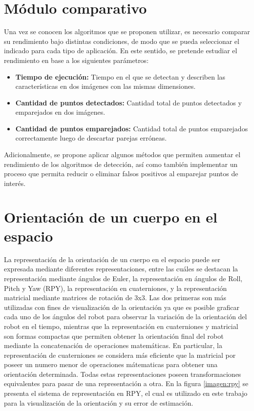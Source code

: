 \section{Módulo comparativo}

Una vez se conocen los algoritmos que se proponen utilizar, es necesario comparar su rendimiento bajo distintas condiciones, de modo que se pueda seleccionar el indicado para cada tipo de aplicación. En este sentido, se pretende estudiar el rendimiento en base a los siguientes parámetros:

\begin{itemize}
	\item \textbf{Tiempo de ejecución:} Tiempo en el que se detectan y describen las características en dos imágenes con las mismas dimensiones.
	
	\item \textbf{Cantidad de puntos detectados:} Cantidad total de puntos detectados y emparejados en dos imágenes.
	
	\item \textbf{Cantidad de puntos emparejados:} Cantidad total de puntos emparejados correctamente luego de descartar parejas erróneas. 
\end{itemize}

Adicionalmente, se propone aplicar algunos métodos que permiten aumentar el rendimiento de los algoritmos de detección, así como también implementar un proceso que permita reducir o eliminar falsos positivos al emparejar puntos de interés. 

\section{ Orientación de un cuerpo en el espacio}

La representación de la orientación de un cuerpo en el espacio puede ser expresada mediante diferentes representaciones, entre las cuáles se destacan la representación mediante ángulos de Euler,  la representación en ángulos de Roll, Pitch y Yaw (RPY), la representación en cuaterniones, y la representación  matricial mediante matrices de rotación de 3x3. Las dos primeras son más utilizadas con fines de visualización de la orientación ya que es posible graficar cada uno de los ángulos del robot para observar la variación de la orientación del robot en el tiempo, mientras que la representación en cuaterniones y matricial son formas compactas que permiten obtener la orientación final del robot mediante la concatenación de operaciones matemáticas. En particular, la representación de cuaterniones se considera más eficiente que la matricial por poseer un numero menor de operaciones mátematicas para obtener una  orientación determinada. Todas estas representaciones poseen transformaciones equivalentes para pasar de una representación a otra. En la figura \ref{imagen:rpy} se presenta el sistema de representación en RPY, el cual es utilizado en este trabajo para la visualización de la orientación y su error de estimación.


